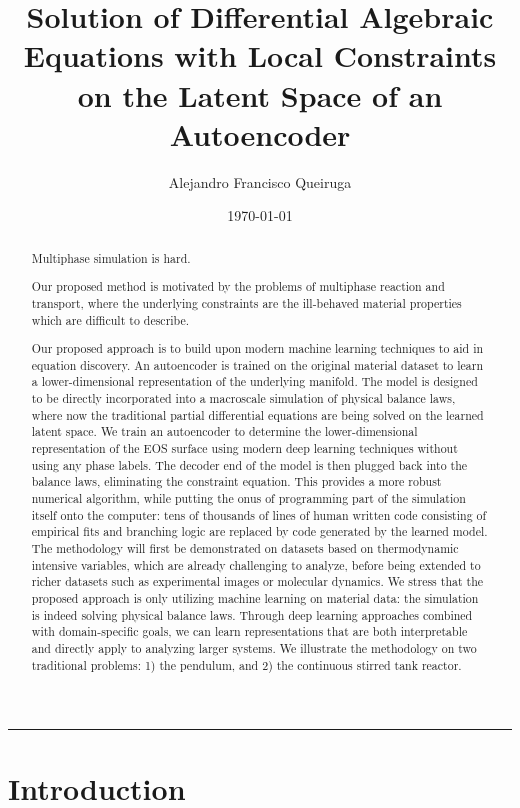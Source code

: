 \documentclass[]{article}
\title{Solution of Differential Algebraic Equations with Local Constraints
on the Latent Space of an Autoencoder}
\author{Alejandro Francisco Queiruga}
\date{\today}
\begin{document}
\maketitle
\begin{abstract}
  Multiphase simulation is hard.

Our proposed method is motivated by the problems of multiphase reaction and
transport, where the underlying constraints are the ill-behaved material
properties which are difficult to describe.
  
Our proposed approach is to build upon modern machine learning
techniques to aid in equation discovery. An autoencoder is trained on
the original material dataset to learn a lower-dimensional
representation of the underlying manifold. The model is designed to be
directly incorporated into a macroscale simulation of physical balance
laws, where now the traditional partial differential equations are being
solved on the learned latent space.
We train an autoencoder to determine the lower-dimensional
representation of the EOS surface using modern deep learning techniques
without using any phase labels. The decoder end of the model is then
plugged back into the balance laws, eliminating the constraint equation.
This provides a more robust
numerical algorithm, while putting the onus of programming part of the
simulation itself onto the computer: tens of thousands of lines of human
written code consisting of empirical fits and branching logic are
replaced by code generated by the learned model. The methodology will
first be demonstrated on datasets based on thermodynamic intensive
variables, which are already challenging to analyze, before being
extended to richer datasets such as experimental images or molecular
dynamics. We stress that the proposed approach is only utilizing machine
learning on material data: the simulation is indeed solving physical
balance laws. Through deep learning approaches combined with
domain-specific goals, we can learn representations that are both
interpretable and directly apply to analyzing larger systems.
We illustrate the methodology on two traditional problems: 1) the
pendulum, and 2) the continuous stirred tank reactor.

\end{abstract}

\begin{center}\rule{0.5\linewidth}{\linethickness}\end{center}

\hypertarget{header-n3216}{%
\section{Introduction}\label{header-n3216}}
\end{document}
